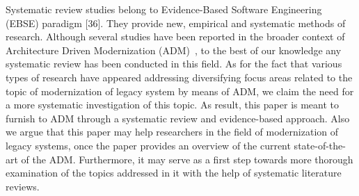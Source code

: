 Systematic review studies belong to Evidence-Based Software Engineering (EBSE) paradigm [36]. They provide new, empirical and systematic methods of research. Although several studies have been reported in the broader context of Architecture Driven Modernization (ADM)~\cite{PerezCastillo20121370, SMR:SMR582, FuentesFernandez2012247, PrezCastillo2011519}, to the best of our knowledge any systematic review has been conducted in this field. As for the fact that various types of research have appeared addressing diversifying focus areas related to the topic of modernization of legacy system by means of ADM, we claim the need for a more systematic investigation of this topic. As result, this paper is meant to furnish to ADM through a systematic review and evidence-based approach. Also we argue that this paper may help researchers in the field of modernization of legacy systems, once the paper provides an overview of the current state-of-the-art of the ADM. Furthermore, it may serve as a first step towards more thorough examination of the topics addressed in it with the help of systematic literature reviews.